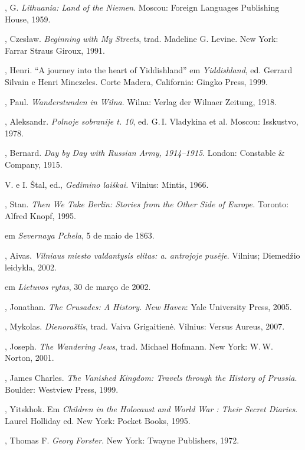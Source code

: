 \begin{bibliohedra}
  , G. \emph{Lithuania: Land of the Niemen}. Moscou: Foreign
  Languages Publishing House, 1959.

  , Czesław. \emph{Beginning with My Streets}, trad. Madeline G.
  Levine. New York: Farrar Straus Giroux, 1991.

  , Henri. ``A journey into the heart of Yiddishland'' em
  \emph{Yiddishland}, ed. Gerrard Silvain e Henri Minczeles. Corte
  Madera, California: Gingko Press, 1999.

  , Paul. \emph{Wanderstunden in Wilna}. Wilna: Verlag der Wilnaer
  Zeitung, 1918.

  , Aleksandr. \emph{Polnoje sobranije t. 10}, ed. G.\,I.
  Vladykina et al. Moscou: Isskustvo, 1978.

  , Bernard. \emph{Day by Day with Russian Army, 1914--1915}.
  London: Constable \& Company, 1915.

   V. e I. Štal, ed., \emph{Gedimino laiškai.} Vilnius: Mintis,
  1966.

  , Stan. \emph{Then We Take Berlin: Stories from the Other Side
  of Europe.} Toronto: Alfred Knopf, 1995.

   em \emph{Severnaya Pchela}, 5 de maio de 1863.

  , Aivas. \emph{Vilniaus miesto valdantysis elitas:  a.
  antrojoje pusėje}. Vilnius; Diemedžio leidykla, 2002.

   em \emph{Lietuvos rytas},
  30 de março de 2002.

  , Jonathan. \emph{The Crusades: A History. New Haven}: Yale
  University Press, 2005.

  , Mykolas. \emph{Dienoraštis}, trad. Vaiva Grigaitienė.
  Vilnius: Versus Aureus, 2007.

  , Joseph. \emph{The Wandering Jews}, trad. Michael Hofmann. New
  York: W.\,W. Norton, 2001.

  , James Charles. \emph{The Vanished Kingdom: Travels through the
  History of Prussia}. Boulder: Westview Press, 1999.

  , Yitskhok. Em \emph{Children in the Holocaust and World
  War : Their Secret Diaries}. Laurel Holliday ed. New York: Pocket
  Books, 1995.

  , Thomas F. \emph{Georg Forster}. New York: Twayne Publishers,
  1972.


\end{bibliohedra}
